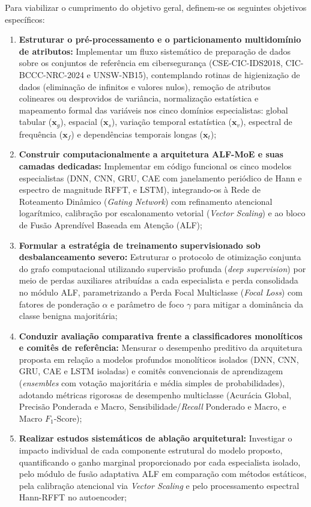 Para viabilizar o cumprimento do objetivo geral, definem-se os seguintes objetivos específicos:
\begin{enumerate}
    \item \textbf{Estruturar o pré-processamento e o particionamento multidomínio de atributos:} Implementar um fluxo sistemático de preparação de dados sobre os conjuntos de referência em cibersegurança (CSE-CIC-IDS2018, CIC-BCCC-NRC-2024 e UNSW-NB15), contemplando rotinas de higienização de dados (eliminação de infinitos e valores nulos), remoção de atributos colineares ou desprovidos de variância, normalização estatística e mapeamento formal das variáveis nos cinco domínios especialistas: global tabular ($\mathbf{x}_g$), espacial ($\mathbf{x}_s$), variação temporal estatística ($\mathbf{x}_v$), espectral de frequência ($\mathbf{x}_f$) e dependências temporais longas ($\mathbf{x}_t$);
    \item \textbf{Construir computacionalmente a arquitetura ALF-MoE e suas camadas dedicadas:} Implementar em código funcional os cinco modelos especialistas (DNN, CNN, GRU, CAE com janelamento periódico de Hann e espectro de magnitude RFFT, e LSTM), integrando-os à Rede de Roteamento Dinâmico (\emph{Gating Network}) com refinamento atencional logarítmico, calibração por escalonamento vetorial (\emph{Vector Scaling}) e ao bloco de Fusão Aprendível Baseada em Atenção (ALF);
    \item \textbf{Formular a estratégia de treinamento supervisionado sob desbalanceamento severo:} Estruturar o protocolo de otimização conjunta do grafo computacional utilizando supervisão profunda (\emph{deep supervision}) por meio de perdas auxiliares atribuídas a cada especialista e perda consolidada no módulo ALF, parametrizando a Perda Focal Multiclasse (\emph{Focal Loss}) com fatores de ponderação $\alpha$ e parâmetro de foco $\gamma$ para mitigar a dominância da classe benigna majoritária;
    \item \textbf{Conduzir avaliação comparativa frente a classificadores monolíticos e comitês de referência:} Mensurar o desempenho preditivo da arquitetura proposta em relação a modelos profundos monolíticos isolados (DNN, CNN, GRU, CAE e LSTM isoladas) e comitês convencionais de aprendizagem (\emph{ensembles} com votação majoritária e média simples de probabilidades), adotando métricas rigorosas de desempenho multiclasse (Acurácia Global, Precisão Ponderada e Macro, Sensibilidade/\emph{Recall} Ponderado e Macro, e Macro $F_1$-Score);
    \item \textbf{Realizar estudos sistemáticos de ablação arquitetural:} Investigar o impacto individual de cada componente estrutural do modelo proposto, quantificando o ganho marginal proporcionado por cada especialista isolado, pelo módulo de fusão adaptativa ALF em comparação com métodos estáticos, pela calibração atencional via \emph{Vector Scaling} e pelo processamento espectral Hann-RFFT no autoencoder;

\end{enumerate}
